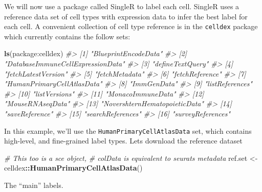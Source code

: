 \documentclass[
]{book}
\newenvironment{Shaded}{\begin{snugshade}}{\end{snugshade}}
\newcommand{\CommentTok}[1]{\textcolor[rgb]{0.56,0.35,0.01}{\textit{#1}}}
\newcommand{\FunctionTok}[1]{\textcolor[rgb]{0.13,0.29,0.53}{\textbf{#1}}}
\newcommand{\NormalTok}[1]{#1}
\newcommand{\OtherTok}[1]{\textcolor[rgb]{0.56,0.35,0.01}{#1}}
\newcommand{\SpecialCharTok}[1]{\textcolor[rgb]{0.81,0.36,0.00}{\textbf{#1}}}
\newcommand{\StringTok}[1]{\textcolor[rgb]{0.31,0.60,0.02}{#1}}
\begin{document}
We will now use a package called SingleR to label each cell. SingleR uses a reference data set of cell types with expression data to infer the best label for each cell. A convenient collection of cell type reference is in the \texttt{celldex} package which currently contains the follow sets:

\begin{Shaded}
\begin{Highlighting}[]
\FunctionTok{ls}\NormalTok{(}\StringTok{\textquotesingle{}package:celldex\textquotesingle{}}\NormalTok{)}
\CommentTok{\#\textgreater{}  [1] "BlueprintEncodeData"             }
\CommentTok{\#\textgreater{}  [2] "DatabaseImmuneCellExpressionData"}
\CommentTok{\#\textgreater{}  [3] "defineTextQuery"                 }
\CommentTok{\#\textgreater{}  [4] "fetchLatestVersion"              }
\CommentTok{\#\textgreater{}  [5] "fetchMetadata"                   }
\CommentTok{\#\textgreater{}  [6] "fetchReference"                  }
\CommentTok{\#\textgreater{}  [7] "HumanPrimaryCellAtlasData"       }
\CommentTok{\#\textgreater{}  [8] "ImmGenData"                      }
\CommentTok{\#\textgreater{}  [9] "listReferences"                  }
\CommentTok{\#\textgreater{} [10] "listVersions"                    }
\CommentTok{\#\textgreater{} [11] "MonacoImmuneData"                }
\CommentTok{\#\textgreater{} [12] "MouseRNAseqData"                 }
\CommentTok{\#\textgreater{} [13] "NovershternHematopoieticData"    }
\CommentTok{\#\textgreater{} [14] "saveReference"                   }
\CommentTok{\#\textgreater{} [15] "searchReferences"                }
\CommentTok{\#\textgreater{} [16] "surveyReferences"}
\end{Highlighting}
\end{Shaded}

In this example, we'll use the \texttt{HumanPrimaryCellAtlasData} set, which contains high-level, and fine-grained label types. Lets download the reference dataset

\begin{Shaded}
\begin{Highlighting}[]
\CommentTok{\# This too is a sce object,}
\CommentTok{\# colData is equivalent to seurat\textquotesingle{}s metadata}
\NormalTok{ref.set }\OtherTok{\textless{}{-}}\NormalTok{ celldex}\SpecialCharTok{::}\FunctionTok{HumanPrimaryCellAtlasData}\NormalTok{()}
\end{Highlighting}
\end{Shaded}

The ``main'' labels.
\end{document}
